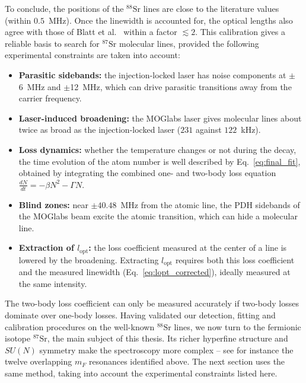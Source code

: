 To conclude, the positions of the $^{88}\text{Sr}$ lines are close to the literature values
(within $0.5$~MHz). Once the linewidth is accounted for, the optical lengths also agree with those of Blatt et al.~\cite{blatt_systematic_2011} within a factor $\lesssim2$.
This calibration gives a reliable basis to search for $^{87}\text{Sr}$
molecular lines, provided the following experimental constraints are taken into
account:
\begin{itemize}
    \item \textbf{Parasitic sidebands:} the injection-locked laser has noise components at $\pm$6~MHz and $\pm$12~MHz, which can drive parasitic transitions away from the carrier
    frequency.

    \item \textbf{Laser-induced broadening:} the MOGlabs laser gives molecular lines about twice as broad as the injection-locked laser ($231$ against $122$~kHz).

    \item \textbf{Loss dynamics:} whether the temperature changes or not during the decay, the time evolution of the atom number is well described by Eq.~\ref{eq:final_fit}, obtained by integrating the combined one-
    and two-body loss equation $\frac{dN}{dt} = -\beta N^2 - \Gamma N$.

    \item \textbf{Blind zones:} near $\pm40.48$~MHz from the atomic line, the PDH sidebands of the MOGlabs beam excite the atomic transition, which can hide a molecular line.

    \item \textbf{Extraction of $l_{\text{opt}}$:} the loss coefficient measured at the center of a line is lowered by the broadening. Extracting $l_{\text{opt}}$ requires both this loss coefficient and the measured linewidth (Eq.~\ref{eq:lopt_corrected}), ideally measured at the same intensity.
\end{itemize}

The two-body loss coefficient can only be measured accurately if two-body losses dominate
over one-body losses. Having validated our detection, fitting and calibration
procedures on the well-known $^{88}\text{Sr}$ lines, we now turn to the
fermionic isotope $^{87}\text{Sr}$, the main subject of this thesis. Its richer
hyperfine structure and $SU(N)$ symmetry make the spectroscopy more complex
-- see for instance the twelve overlapping $m_F$ resonances identified above. The next
section uses the same method, taking into account the experimental constraints listed here.

